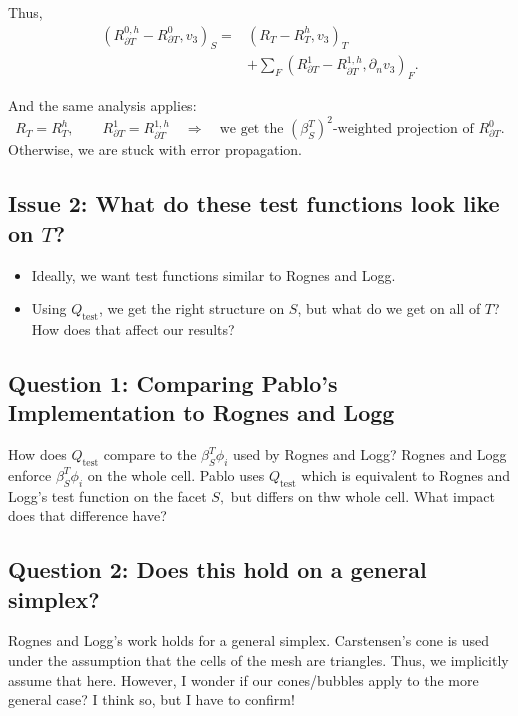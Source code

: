 \documentclass[12pt,a4paper]{article}
\newcommand{\qtest}{Q_{\mathrm{test}}}
\newcommand{\dn}{\partial_n}
\newcommand{\Rone}{R_{\partial T}^{1}}
\newcommand{\Rzero}{R_{\partial T}^{0}}
\newcommand{\Roneh}{R_{\partial T}^{1,h}}
\newcommand{\Rzeroh}{R_{\partial T}^{0,h}}
\begin{document}
Thus,
\begin{align}
    (\Rzeroh-\Rzero,v_3)_S
       ={}&(R_T-R_T^h,v_3)_T\\
          &+\sum_F(\Rone-\Roneh,\dn v_3)_F.
\end{align}

And the same analysis applies:
\begin{equation}
    R_T=R_T^h,
    \qquad \Rone=\Roneh
    \quad\Longrightarrow\quad
    \text{we get the $(\beta_S^T)^2$-weighted projection of $\Rzero$.}
\end{equation}
Otherwise, we are stuck with error propagation.

\subsection{Issue 2: What do these test functions look like on $T$?}

\begin{itemize}
    \item Ideally, we want test functions similar to Rognes and Logg.
    \item Using $\qtest$, we get the right structure on $S$, but what do we get on all of $T$? How does that affect our results?
\end{itemize}

\subsection{Question 1: Comparing Pablo's Implementation to Rognes and Logg}

 How does $\qtest$ compare to the $\beta_S^T\phi_i$ used by Rognes and Logg? Rognes and Logg enforce $\beta_S^T \phi_i$ on the whole cell. Pablo uses $\qtest$ which is equivalent to Rognes and Logg's test function on the facet $S,$ but differs on thw whole cell. What impact does that difference have? 


\subsection{Question 2: Does this hold on a general simplex?}

Rognes and Logg's work holds for a general simplex. Carstensen's cone is used under the assumption that the cells of the mesh are triangles. Thus, we implicitly assume that here. However, I wonder if our cones/bubbles apply to the more general case? I think so, but I have to confirm!
\end{document}

